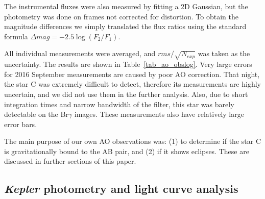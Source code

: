 \documentclass{aa}
\newcommand{\kep}{{\it Kepler }}
\begin{document}
The instrumental fluxes were also measured by fitting a 2D Gaussian, but the 
photometry was done on frames not corrected for distortion. To obtain the magnitude
differences we simply translated the flux ratios using the standard formula
$\Delta mag = -2.5\log(F_2/F_1)$.

All individual measurements were averaged, and $rms/\sqrt{N_{exp}}$ was taken as the 
uncertainty. The results are shown in Table~\ref{tab_ao_obslog}. Very large errors 
for 2016 September measurements are caused by poor AO correction. That night, 
the star C was extremely difficult to detect, therefore its measurements are highly 
uncertain, and we did not use them in the further analysis. Also, due to short integration 
times and narrow bandwidth of the filter, this star was barely detectable on the Br$\gamma$
images. These measurements also have relatively large error bars.

The main purpose of our own AO observations was: (1) to determine if the star C is 
gravitationally bound to the AB pair, and (2) if it shows eclipses. These are discussed in
further sections of this paper.

\subsection{\kep photometry and light curve analysis}\label{sec_kep_phot}
\end{document}
